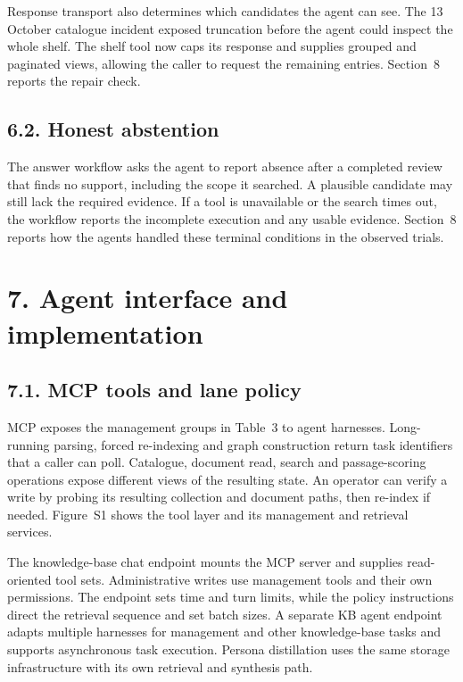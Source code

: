 Response transport also determines which candidates the agent can see.
The 13 October catalogue incident exposed truncation before the agent
could inspect the whole shelf. The shelf tool now caps its response and
supplies grouped and paginated views, allowing the caller to request the
remaining entries. Section~8 reports the repair check.

\subsection{6.2. Honest abstention}
The answer workflow asks the agent to report absence after a completed
review that finds no support, including the scope it searched. A plausible
candidate may still lack the required evidence. If a tool is unavailable
or the search times out, the workflow reports the incomplete execution
and any usable evidence. Section~8 reports how the agents
handled these terminal conditions in the observed trials.


\section{7. Agent interface and implementation}



\subsection{7.1. MCP tools and lane policy}


MCP exposes the management groups in Table~3 to agent
harnesses. Long-running parsing, forced re-indexing and graph construction
return task identifiers that a caller can poll. Catalogue, document read,
search and passage-scoring operations expose different views of the
resulting state. An operator can verify a write by probing its resulting
collection and document paths, then re-index if needed. Figure~S1 shows the tool layer and
its management and retrieval services.

The knowledge-base chat endpoint mounts the MCP server and supplies
read-oriented tool sets. Administrative writes use management tools and
their own permissions. The endpoint sets time and turn limits, while the
policy instructions direct the retrieval sequence and set batch sizes.
A separate KB agent endpoint adapts multiple harnesses for management and
other knowledge-base tasks and supports asynchronous task execution.
Persona distillation uses the same storage infrastructure with its own
retrieval and synthesis path.

